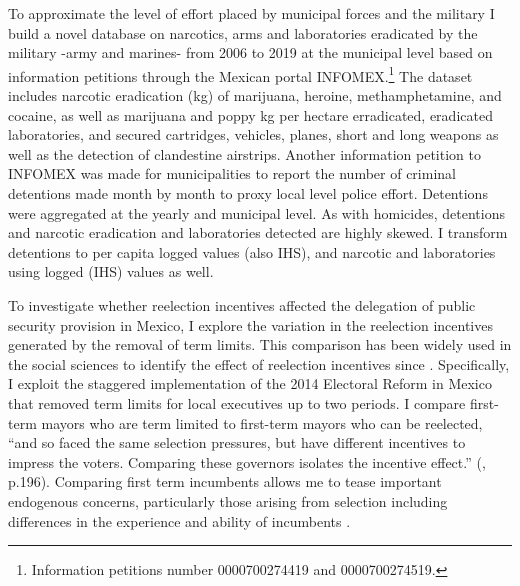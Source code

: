 \documentclass[12pt]{amsart}
\makeatletter
\def\section{\@startsection{section}{1}
	\z@{1.0\linespacing\@plus\linespacing}{.5\linespacing}{\Large}}
\numberwithin{equation}{section}
\theoremstyle{definition}
\theoremstyle{definition}
\theoremstyle{definition}
\makeatother
\begin{document}
To approximate the level of effort placed by municipal forces and the military I build a novel database on narcotics, arms and laboratories eradicated by the military -army and marines- from 2006 to 2019 at the municipal level  based on information petitions through the Mexican portal INFOMEX.\footnote{Information petitions number 0000700274419 and 0000700274519.} The dataset includes narcotic eradication (kg) of marijuana, heroine, methamphetamine, and cocaine, as well as marijuana and poppy kg per hectare erradicated, eradicated laboratories, and secured cartridges, vehicles, planes, short and long weapons as well as the detection of clandestine airstrips. %
Another information petition to INFOMEX was made for municipalities to report the number of criminal detentions made month by month to proxy local level police effort. Detentions were aggregated at the yearly and municipal level. As with homicides, detentions and narcotic eradication and laboratories detected are highly skewed. I transform detentions to per capita logged values (also IHS), and narcotic and laboratories using logged (IHS) values as well. 

\section{Research Design \label{sec:design}}  

To investigate whether reelection incentives affected the delegation of public security provision in Mexico, I explore the variation in the reelection incentives generated by the removal of term limits. This comparison has been widely used in the social sciences to identify the effect of reelection incentives since \citet{Besley_case_1995}. Specifically, I exploit the staggered implementation of the 2014 Electoral Reform in Mexico that removed term limits for local executives up to two periods. I compare first-term mayors who are term limited to first-term mayors who can be reelected, ``and so faced the same selection pressures, but have different incentives to impress the voters. Comparing these governors isolates the incentive effect.'' (\citet{ashworth_2012}, p.196). Comparing first term incumbents allows me to tease important endogenous concerns, particularly those arising from selection including differences in the experience and ability of incumbents \citep{ferraz_finan_2011}. 
   
\end{document}

